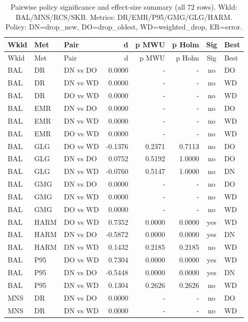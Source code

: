 \begin{center}
\scriptsize
\setlength\LTleft{0pt}
\setlength\LTright{0pt}
\begin{longtable}{p{1.0cm}p{1.0cm}p{1.8cm}r r r c p{1.0cm}}
\caption{Pairwise policy significance and effect-size summary (all 72 rows). Wkld: BAL/MNS/RCS/SKB. Metrics: DR/EMR/P95/GMG/GLG/HARM. Policy: DN=drop\_new, DO=drop\_oldest, WD=weighted\_drop, ER=error.}\label{tab:pairwise_significance}\\
\hline
Wkld & Met & Pair & d & p MWU & p Holm & Sig & Best \\
\hline
\endfirsthead
\hline
Wkld & Met & Pair & d & p MWU & p Holm & Sig & Best \\
\hline
\endhead
BAL & DR & DN vs DO & 0.0000 & - & - & no & DO \\
BAL & DR & DN vs WD & 0.0000 & - & - & no & WD \\
BAL & DR & DO vs WD & 0.0000 & - & - & no & WD \\
BAL & EMR & DN vs DO & 0.0000 & - & - & no & DO \\
BAL & EMR & DN vs WD & 0.0000 & - & - & no & WD \\
BAL & EMR & DO vs WD & 0.0000 & - & - & no & WD \\
BAL & GLG & DO vs WD & -0.1376 & 0.2371 & 0.7113 & no & DO \\
BAL & GLG & DN vs DO & 0.0752 & 0.5192 & 1.0000 & no & DO \\
BAL & GLG & DN vs WD & -0.0760 & 0.5147 & 1.0000 & no & DN \\
BAL & GMG & DN vs DO & 0.0000 & - & - & no & DO \\
BAL & GMG & DN vs WD & 0.0000 & - & - & no & WD \\
BAL & GMG & DO vs WD & 0.0000 & - & - & no & WD \\
BAL & HARM & DO vs WD & 0.7352 & 0.0000 & 0.0000 & yes & WD \\
BAL & HARM & DN vs DO & -0.5872 & 0.0000 & 0.0000 & yes & DN \\
BAL & HARM & DN vs WD & 0.1432 & 0.2185 & 0.2185 & no & WD \\
BAL & P95 & DO vs WD & 0.7304 & 0.0000 & 0.0000 & yes & WD \\
BAL & P95 & DN vs DO & -0.5448 & 0.0000 & 0.0000 & yes & DN \\
BAL & P95 & DN vs WD & 0.1304 & 0.2626 & 0.2626 & no & WD \\
MNS & DR & DN vs DO & 0.0000 & - & - & no & DO \\
MNS & DR & DN vs WD & 0.0000 & - & - & no & WD \\

\end{longtable}
\end{center}
